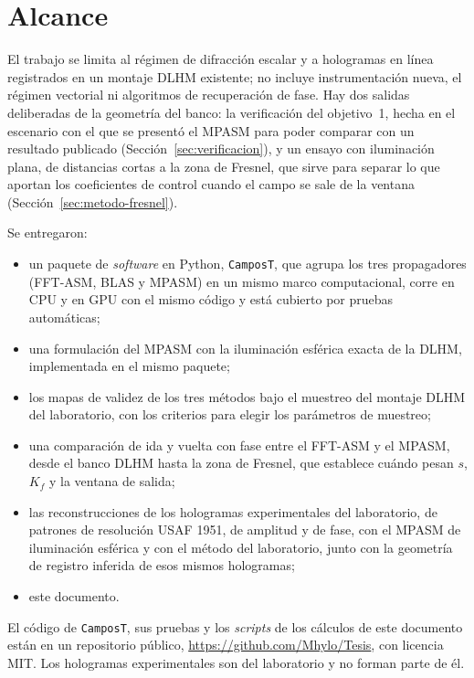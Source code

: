 \section{Alcance}

El trabajo se limita al régimen de difracción escalar y a hologramas en línea
registrados en un montaje DLHM existente; no incluye instrumentación nueva, el
régimen vectorial ni algoritmos de recuperación de fase. Hay dos salidas
deliberadas de la geometría del banco: la verificación del objetivo~1, hecha en
el escenario con el que se presentó el MPASM para poder comparar con un
resultado publicado (Sección~\ref{sec:verificacion}), y un ensayo con
iluminación plana, de distancias cortas a la zona de Fresnel, que sirve para
separar lo que aportan los coeficientes de control cuando el campo se sale de
la ventana (Sección~\ref{sec:metodo-fresnel}).

Se entregaron:
\begin{itemize}
  \item un paquete de \emph{software} en Python, \texttt{CamposT}, que agrupa
  los tres propagadores (FFT-ASM, BLAS y MPASM) en un mismo marco
  computacional, corre en CPU y en GPU con el mismo código y está cubierto por
  pruebas automáticas;
  \item una formulación del MPASM con la iluminación esférica exacta de la
  DLHM, implementada en el mismo paquete;
  \item los mapas de validez de los tres métodos bajo el muestreo del montaje
  DLHM del laboratorio, con los criterios para elegir los parámetros de
  muestreo;
  \item una comparación de ida y vuelta con fase entre el FFT-ASM y el MPASM,
  desde el banco DLHM hasta la zona de Fresnel, que establece cuándo pesan
  $s$, $K_f$ y la ventana de salida;
  \item las reconstrucciones de los hologramas experimentales del laboratorio,
  de patrones de resolución USAF 1951, de amplitud y de fase, con el MPASM de iluminación
  esférica y con el método del laboratorio, junto con la geometría de registro
  inferida de esos mismos hologramas;
  \item este documento.
\end{itemize}

El código de \texttt{CamposT}, sus pruebas y los \emph{scripts} de los
cálculos de este documento están en un repositorio público,
\url{https://github.com/Mhylo/Tesis}, con licencia MIT. Los hologramas
experimentales son del laboratorio y no forman parte de él.

